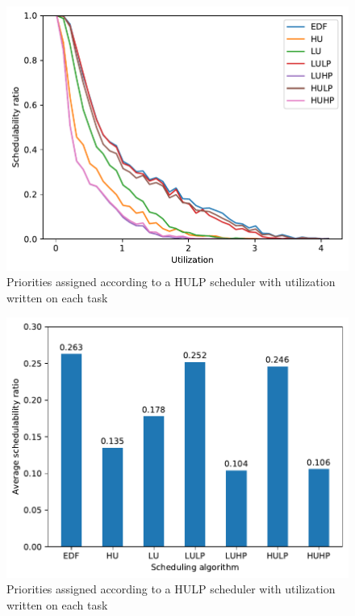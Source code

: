 \documentclass{kththesis}
\begin{document}
\begin{figure}[H]

    \centering

    \includegraphics[width=0.8\linewidth]{images/sched_algos.pdf}

    \caption{Priorities assigned according to a HULP scheduler with utilization written on each task}

    \label{fig:sched_algos}

\end{figure}

\begin{figure}[H]

    \centering

    \includegraphics[width=0.8\linewidth]{images/sched_algos_averages.pdf}

    \caption{Priorities assigned according to a HULP scheduler with utilization written on each task}

    \label{fig:sched_algos_averages}

\end{figure}
\end{document}
